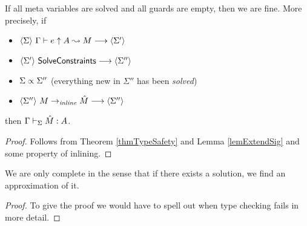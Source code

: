 \begin{theorem}[Soundness]
    If all meta variables are solved and all guards are empty, then we are fine. More precisely, if
    \begin{itemize}
	\item $\langle {\Sigma} \rangle ~{{\Gamma} \vdash {e} \uparrow {A} \leadsto {M}} \longrightarrow \langle {\Sigma'} \rangle$
	\item ${\langle {\Sigma'} \rangle ~{\mathsf{SolveConstraints}} \longrightarrow \langle {\Sigma''} \rangle}$
	\item ${{\Sigma} \propto {\Sigma''}}$ (everything new in $\Sigma''$ has been {\em solved})
	\item ${\langle {\Sigma''} \rangle ~{{M} \to_{\mathit{inline}} {\hat M}} \longrightarrow \langle {\Sigma''} \rangle}$
    \end{itemize}
    then $\Gamma\vdash_{\Sigma}\hat M:A$.
\end{theorem}
\begin{proof}
    Follows from Theorem \ref{thmTypeSafety} and Lemma \ref{lemExtendSig} and
    some property of inlining.
\end{proof}

\begin{theorem}[Completeness]
    We are only complete in the sense that if there exists a solution, we find
    an approximation of it.
\end{theorem}
\begin{proof}
    To give the proof we would have to spell out when type checking fails in
    more detail.
\end{proof}

